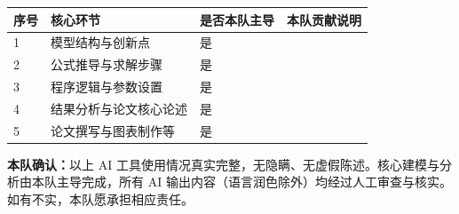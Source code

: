 \begin{center}
{\small\setlength{\tabcolsep}{4pt}
\begin{tabularx}{\textwidth}{@{}p{1.0cm}Z Y Z@{}}
\toprule
\textbf{序号} & \textbf{核心环节} & \textbf{是否本队主导} & \textbf{本队贡献说明} \\
 & 模型结构与创新点 & 是 & \\
2 & 公式推导与求解步骤 & 是 & \\
3 & 程序逻辑与参数设置 & 是 & \\
4 & 结果分析与论文核心论述 & 是 & \\
5 & 论文撰写与图表制作等 & 是 & \\
\bottomrule
\end{tabularx}}
\end{center}

\vspace{1.5em}

\noindent\textbf{本队确认：}以上 AI 工具使用情况真实完整，无隐瞒、无虚假陈述。核心建模与分析由本队主导完成，所有 AI 输出内容（语言润色除外）均经过人工审查与核实。如有不实，本队愿承担相应责任。
